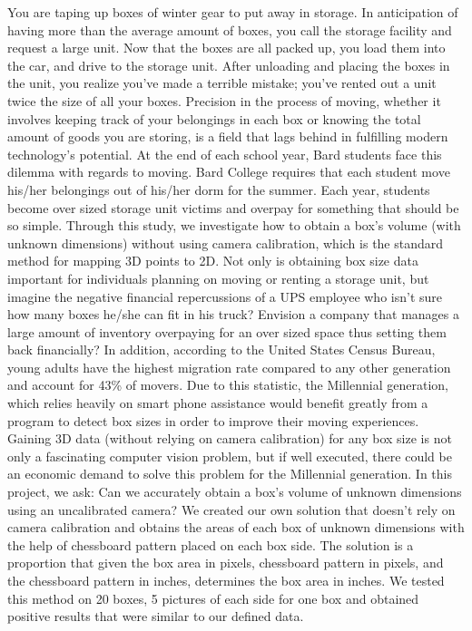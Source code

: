 \documentclass[11pt, twoside, reqno]{book}
\begin{document}
You are taping up boxes of winter gear to put away in storage. In anticipation of having more than the average amount of boxes, you call the storage facility and request a large unit. Now that the boxes are all packed up, you load them into the car, and drive to the storage unit. After unloading and placing the boxes in the unit, you realize you've made a terrible mistake; you've rented out a unit twice the size of all your boxes. 
Precision in the process of moving, whether it involves keeping track of your belongings in each box or knowing the total amount of goods you are storing, is a field that lags behind in fulfilling modern technology's potential. At the end of each school year, Bard students face this dilemma with regards to moving. Bard College requires that each student move his/her belongings out of his/her dorm for the summer. Each year, students become over sized storage unit victims and overpay for something that should be so simple.
Through this study, we investigate how to obtain a box's volume (with unknown dimensions) without using camera calibration, which is the standard method for mapping 3D points to 2D.\cite{Solem} Not only is obtaining box size data important for individuals planning on moving or renting a storage unit, but imagine the negative financial repercussions of a UPS employee who isn't sure how many boxes he/she can fit in his truck? Envision a company that manages a large amount of inventory overpaying for an over sized space thus setting them back financially? In addition, according to the United States Census Bureau, young adults have the highest migration rate compared to any other generation and account for 43\% of movers\cite{census}. Due to this statistic, the Millennial generation, which relies heavily on smart phone assistance would benefit greatly from a program to detect box sizes in order to improve their moving experiences. Gaining 3D data (without relying on camera calibration) for any box size is not only a fascinating computer vision problem, but if well executed, there could be an economic demand to solve this problem for the Millennial generation. In this project, we ask: Can we accurately obtain a box's volume of unknown dimensions using an uncalibrated camera? We created our own solution that doesn't rely on camera calibration and obtains the areas of each box of unknown dimensions with the help of chessboard pattern placed on each box side. The solution is a proportion that given the box area in pixels, chessboard pattern in pixels, and the chessboard pattern in inches, determines the box area in inches. We tested this method on 20 boxes, 5 pictures of each side for one box and obtained positive results that were similar to our defined data.
\end{document}
